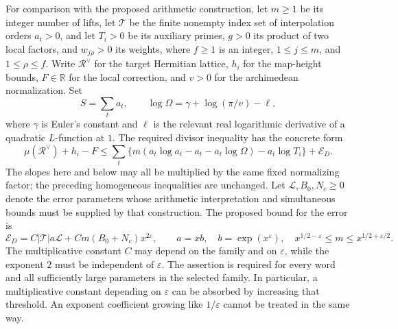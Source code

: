 For comparison with the proposed arithmetic construction, let $m\ge1$ be
its integer number of lifts, let $\mathcal T$ be the finite nonempty
index set of interpolation orders $a_t>0$, and let $T_i>0$ be its
auxiliary primes, $g>0$ its product of two local factors, and $w_{j\rho}>0$
its weights, where $f\ge1$ is an integer,
$1\le j\le m$, and $1\le\rho\le f$. Write $\mathcal R^\vee$
for the target Hermitian lattice, $h_i$ for the map-height bounds,
$F\in\mathbb R$ for the local correction, and $v>0$ for the
archimedean normalization. Set
\[
 S=\sum_t a_t,\qquad
 \log\Omega=\gamma+\log(\pi/v)-\ell,
\]
where $\gamma$ is Euler's constant and $\ell$ is the relevant real
logarithmic derivative of a quadratic $L$-function at $1$. The required
divisor inequality has the concrete form
\begin{equation}\label{cs-required-divisor}
 \mu(\mathcal R^\vee)+h_i-F\le
 \sum_t\{m(a_t\log a_t-a_t-a_t\log\Omega)-a_t\log T_i\}
       +\mathcal E_D.
\end{equation}
The slopes here and below may all be multiplied by the same fixed
normalizing factor; the preceding homogeneous inequalities are unchanged.
Let $\mathcal L,B_0,N_c\ge0$ denote the error parameters whose
arithmetic interpretation and simultaneous bounds must be supplied by
that construction. The proposed bound for the error is
\[
 \mathcal E_D=C|\mathcal T|a\mathcal L
             +Cm(B_0+N_c)x^{2\varepsilon},
 \qquad a=xb,\quad b=\exp(x^\varepsilon),\quad
 x^{1/2-\varepsilon}\le m\le x^{1/2+\varepsilon/2}.
\]
The multiplicative constant $C$ may depend on the family and on
$\varepsilon$, while the exponent $2$ must be independent of
$\varepsilon$. The assertion is required for every word and all
sufficiently large parameters in the selected family.
In particular, a multiplicative constant depending on $\varepsilon$
can be absorbed by increasing that threshold. An exponent coefficient
growing like $1/\varepsilon$ cannot be treated in the same way.

